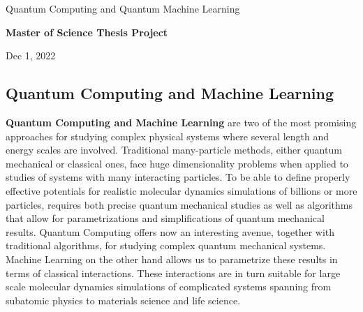 \documentclass[%
oneside,                 %
final,                   %
10pt]{article}
\begin{document}

\newcommand{\exercisesection}[1]{\subsection*{#1}}






\thispagestyle{empty}

\begin{center}
{\LARGE\bf
\begin{spacing}{1.25}
Quantum Computing and Quantum Machine Learning
\end{spacing}
}
\end{center}


\begin{center}
{\bf Master of Science Thesis Project${}^{}$} \\ [0mm]
\end{center}

\begin{center}
\end{center}
    

\begin{center}
Dec 1, 2022
\end{center}

\vspace{1cm}


\subsection*{Quantum Computing and Machine Learning}

\textbf{Quantum Computing and Machine Learning} are two of the most promising
approaches for studying complex physical systems where several length
and energy scales are involved.  Traditional many-particle methods,
either quantum mechanical or classical ones, face huge dimensionality
problems when applied to studies of systems with many interacting
particles. To be able to define properly effective potentials for
realistic molecular dynamics simulations of billions or more
particles, requires both precise quantum mechanical studies as well as
algorithms that allow for parametrizations and simplifications of
quantum mechanical results. Quantum Computing offers now an
interesting avenue, together with traditional algorithms, for studying
complex quantum mechanical systems. Machine Learning on the other hand
allows us to parametrize these results in terms of classical
interactions. These interactions are in turn suitable for large scale
molecular dynamics simulations of complicated systems spanning from
subatomic physics to materials science and life science.
\end{document}
